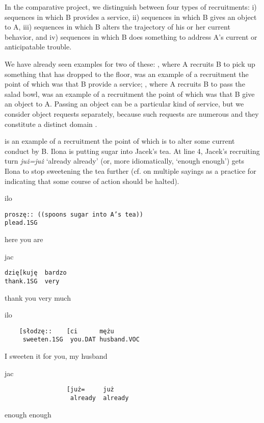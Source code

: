 \documentclass[output=paper]{langsci/langscibook}
\begin{document}
In the comparative project, we distinguish between four types of recruitments: i) sequences in which B provides a service, ii) sequences in which B gives an object to A, iii) sequences in which B alters the trajectory of his or her current behavior, and iv)  sequences in which B does something to address A’s current or anticipatable trouble.

We have already seen examples for two of these: , where A recruits B to pick up something that has dropped to the floor, was an example of a recruitment the point of which was that B provide a service; , where A recruits B to pass the salad bowl, was an example of a recruitment the point of which was that B give an object to A.  Passing an object can be a particular kind of service, but we consider object requests separately, because such requests are numerous and they constitute a distinct domain \citep[see also][]{Zinken2015}.

 is an example of a recruitment the point of which is to alter some current conduct by B.  Ilona is putting sugar into Jacek’s tea.  At line 4, Jacek’s recruiting turn \textit{już=już} `already already' (or, more idiomatically, `enough enough') gets Ilona to stop sweetening the tea further (cf. \citealt{Stivers2004} on multiple sayings as a practice for indicating that some course of action should be halted).

\vspace{2mm}
%
\begin{transbox}{1}{ilo}
\begin{verbatim}
proszę:: ((spoons sugar into A’s tea))
plead.1SG
\end{verbatim}
here you are
\end{transbox}
%
\begin{transbox}{2}{jac}
\begin{verbatim}
dzię[kuję  bardzo
thank.1SG  very
\end{verbatim}
thank you very much
\end{transbox}
%
\begin{transbox}{3}{ilo}
\begin{verbatim}
    [słodzę::    [ci      mężu
     sweeten.1SG  you.DAT husband.VOC
\end{verbatim}
\hspace{0.6cm} I sweeten it for you, my husband
\end{transbox}
%
\begin{mdframednoverticalspace}[style=firstfoc]
\begin{transbox}{4}{jac}
\begin{verbatim}
                 [już=     już
                  already  already
\end{verbatim}
\hspace{2.6cm} enough enough
\end{transbox}
\end{mdframednoverticalspace}
%
\begin{mdframednoverticalspace}[style=secondfoc]
\end{mdframednoverticalspace}
\end{document}
